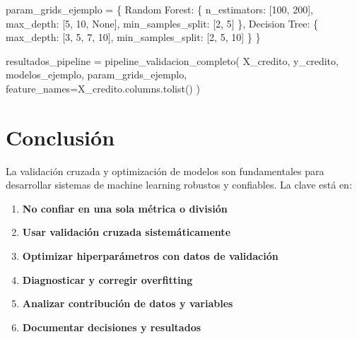 \documentclass[
  doc,
  floatsintext,
  longtable,
  a4paper,
  nolmodern,
  notxfonts,
  notimes,
  12pt,
  colorlinks=true,linkcolor=blue,citecolor=blue,urlcolor=blue]{apa7}
\newenvironment{Shaded}{\begin{snugshade}}{\end{snugshade}}
\newcommand{\DecValTok}[1]{\textcolor[rgb]{0.68,0.00,0.00}{#1}}
\newcommand{\NormalTok}[1]{\textcolor[rgb]{0.00,0.23,0.31}{#1}}
\newcommand{\OperatorTok}[1]{\textcolor[rgb]{0.37,0.37,0.37}{#1}}
\newcommand{\StringTok}[1]{\textcolor[rgb]{0.13,0.47,0.30}{#1}}
\newcommand{\VariableTok}[1]{\textcolor[rgb]{0.07,0.07,0.07}{#1}}
\providecommand{\tightlist}{%
  \setlength{\itemsep}{0pt}\setlength{\parskip}{0pt}}
\begin{document}
\begin{Shaded}
\begin{Highlighting}[]
\NormalTok{param\_grids\_ejemplo }\OperatorTok{=}\NormalTok{ \{}
    \StringTok{\textquotesingle{}Random Forest\textquotesingle{}}\NormalTok{: \{}
        \StringTok{\textquotesingle{}n\_estimators\textquotesingle{}}\NormalTok{: [}\DecValTok{100}\NormalTok{, }\DecValTok{200}\NormalTok{],}
        \StringTok{\textquotesingle{}max\_depth\textquotesingle{}}\NormalTok{: [}\DecValTok{5}\NormalTok{, }\DecValTok{10}\NormalTok{, }\VariableTok{None}\NormalTok{],}
        \StringTok{\textquotesingle{}min\_samples\_split\textquotesingle{}}\NormalTok{: [}\DecValTok{2}\NormalTok{, }\DecValTok{5}\NormalTok{]}
\NormalTok{    \},}
    \StringTok{\textquotesingle{}Decision Tree\textquotesingle{}}\NormalTok{: \{}
        \StringTok{\textquotesingle{}max\_depth\textquotesingle{}}\NormalTok{: [}\DecValTok{3}\NormalTok{, }\DecValTok{5}\NormalTok{, }\DecValTok{7}\NormalTok{, }\DecValTok{10}\NormalTok{],}
        \StringTok{\textquotesingle{}min\_samples\_split\textquotesingle{}}\NormalTok{: [}\DecValTok{2}\NormalTok{, }\DecValTok{5}\NormalTok{, }\DecValTok{10}\NormalTok{]}
\NormalTok{    \}}
\NormalTok{\}}

\NormalTok{resultados\_pipeline }\OperatorTok{=}\NormalTok{ pipeline\_validacion\_completo(}
\NormalTok{    X\_credito, y\_credito,}
\NormalTok{    modelos\_ejemplo,}
\NormalTok{    param\_grids\_ejemplo,}
\NormalTok{    feature\_names}\OperatorTok{=}\NormalTok{X\_credito.columns.tolist()}
\NormalTok{)}
\end{Highlighting}
\end{Shaded}

\section{Conclusión}\label{conclusiuxf3n}

La validación cruzada y optimización de modelos son fundamentales para
desarrollar sistemas de machine learning robustos y confiables. La clave
está en:

\begin{enumerate}
\def\labelenumi{\arabic{enumi}.}
\tightlist
\item
  \textbf{No confiar en una sola métrica o división}
\item
  \textbf{Usar validación cruzada sistemáticamente}
\item
  \textbf{Optimizar hiperparámetros con datos de validación}
\item
  \textbf{Diagnosticar y corregir overfitting}
\item
  \textbf{Analizar contribución de datos y variables}
\item
  \textbf{Documentar decisiones y resultados}
\end{enumerate}
\end{document}
